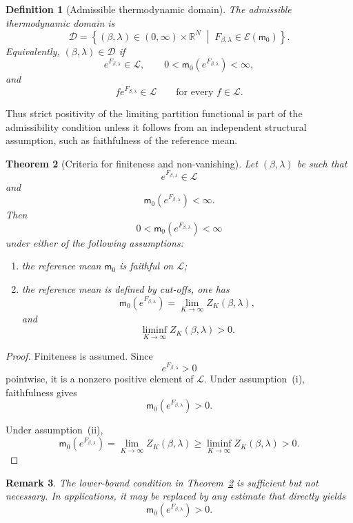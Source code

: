 \documentclass[11pt,reqno]{amsart}
\newtheorem{Theorem}{Theorem}[section]
\newtheorem{Definition}[Theorem]{Definition}
\newtheorem{rem}[Theorem]{Remark}
\begin{document}
\begin{Definition}[Admissible thermodynamic domain]
\label{def:admissible-domain}
The admissible thermodynamic domain is
\[
\mathcal D
=
\left\{
(\beta,\lambda)\in(0,\infty)\times\mathbb R^N
\;\middle|\;
F_{\beta,\lambda}\in\mathcal E(\mathsf m_0)
\right\}.
\]
Equivalently, $(\beta,\lambda)\in\mathcal D$ if
\[
e^{F_{\beta,\lambda}}\in\mathcal L,
\qquad
0<
\mathsf m_0(e^{F_{\beta,\lambda}})
<\infty,
\]
and
\[
fe^{F_{\beta,\lambda}}\in\mathcal L
\qquad
\text{for every }f\in\mathcal L.
\]
\end{Definition}

Thus strict positivity of the limiting partition functional is part of
the admissibility condition unless it follows from an independent
structural assumption, such as faithfulness of the reference mean.

\begin{Theorem}[Criteria for finiteness and non-vanishing]
\label{thm:partition-positive}
\label{prop:partition-nonvanishing}
Let $(\beta,\lambda)$ be such that
\[
e^{F_{\beta,\lambda}}\in\mathcal L
\]
and
\[
\mathsf m_0(e^{F_{\beta,\lambda}})<\infty.
\]
Then
\[
0<
\mathsf m_0(e^{F_{\beta,\lambda}})
<\infty
\]
under either of the following assumptions:
\begin{enumerate}
\item[\textup{(i)}] the reference mean $\mathsf m_0$ is faithful on
$\mathcal L$;
\item[\textup{(ii)}] the reference mean is defined by cut-offs, one has
\[
\mathsf m_0(e^{F_{\beta,\lambda}})
=
\lim_{K\to\infty}Z_K(\beta,\lambda),
\]
and
\[
\liminf_{K\to\infty}Z_K(\beta,\lambda)>0.
\]
\end{enumerate}
\end{Theorem}

\begin{proof}
Finiteness is assumed. Since
\[
e^{F_{\beta,\lambda}}>0
\]
pointwise, it is a nonzero positive element of $\mathcal L$. Under
assumption~\textup{(i)}, faithfulness gives
\[
\mathsf m_0(e^{F_{\beta,\lambda}})>0.
\]

Under assumption~\textup{(ii)},
\[
\mathsf m_0(e^{F_{\beta,\lambda}})
=
\lim_{K\to\infty}Z_K(\beta,\lambda)
\geq
\liminf_{K\to\infty}Z_K(\beta,\lambda)>0.
\]
\end{proof}

\begin{rem}
The lower-bound condition in
Theorem~\ref{thm:partition-positive} is sufficient but not necessary. In
applications, it may be replaced by any estimate that directly yields
\[
\mathsf m_0(e^{F_{\beta,\lambda}})>0.
\]
\end{rem}
\end{document}
